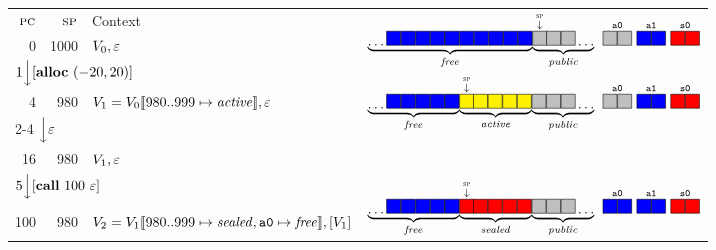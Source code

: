 \documentclass[10pt,conference]{ieeetran}%
\theoremstyle{definition}
\begin{document}
\begin{figure*}
  \begin{tabular}{|r|r||l|r}
    \cline{1-3}
    \(\textsc{pc}\) & \(\textsc{sp}\) & Context &
    \multirow{3}{*}{\(\underbrace{\dots \freebox \freebox \freebox \freebox \freebox
        \freebox \freebox \freebox \freebox \freebox}_\unsealed
      \! \underbrace{\stackrel{\stackrel{\SP}{\downarrow}}{\pubbox} \!\! \pubbox \pubbox \dots}_\public
      ~ \stackrel{\mathtt{a0}}{\pubbox\pubbox} ~ \stackrel{\mathtt{a1}}{\freebox\freebox}
      ~ \stackrel{\mathtt{s0}}{\sealbox\sealbox}
      \)} \\
    \cline{1-3}
    0 & 1000 & \(V_0, \varepsilon\)
    \\
    \cline{1-3}
    \multicolumn{3}{l}{\multirow{2}{*}{\(1 \Big\downarrow [\mathbf{alloc} ~ (-20,20)]\)}} & \\
    \multicolumn{3}{l}{} &
    \multirow{3}{*}{\(\underbrace{\dots \freebox \freebox \freebox \freebox \freebox}_\unsealed
      \! \underbrace{\stackrel{\stackrel{\SP}{\downarrow}}{\objbox} \!\! \objbox \objbox \objbox \objbox}_\object
      \! \underbrace{\pubbox \pubbox \pubbox \dots}_\public
      ~ \stackrel{\mathtt{a0}}{\pubbox\pubbox} ~ \stackrel{\mathtt{a1}}{\freebox\freebox}
      ~ \stackrel{\mathtt{s0}}{\sealbox\sealbox}
      \)}
    \\
    \cline{1-3}
    4 & 980 & \(V_1 = V_0 \llbracket 980..999 \mapsto \mathit{active}\rrbracket, \varepsilon\) &
    \\
    \cline{1-3}
    \multicolumn{3}{l}{\multirow{2}{*}{2-4 \(\Big\downarrow \varepsilon\)}} \\ \multicolumn{3}{l}{} \\
    \cline{1-3}
    16 & 980 & \(V_1, \varepsilon\) & \\
    \cline{1-3}
    \multicolumn{3}{l}{\multirow{2}{*}{\(5 \Big\downarrow [\mathbf{call} ~ 100 ~ \varepsilon]\)}} & \\
    \multicolumn{3}{l}{} &
    \multirow{3}{*}{\(\underbrace{\dots \freebox \freebox \freebox \freebox \freebox}_\unsealed
      \! \underbrace{\stackrel{\stackrel{\SP}{\downarrow}}{\sealbox} \!\! \sealbox \sealbox \sealbox \sealbox}_\sealed
      \! \underbrace{\pubbox \pubbox \pubbox \dots}_\public
      ~ \stackrel{\mathtt{a0}}{\freebox\freebox} ~ \stackrel{\mathtt{a1}}{\freebox\freebox}
      ~ \stackrel{\mathtt{s0}}{\sealbox\sealbox}
      \)}
    \\
    \cline{1-3}
    100 & 980 & \(V_2 = V_1 \llbracket 980..999 \mapsto \mathit{sealed}, \mathtt{a0} \mapsto \mathit{free}\rrbracket,[V_1]\) & \\

\end{tabular}
\end{figure*}
\end{document}
